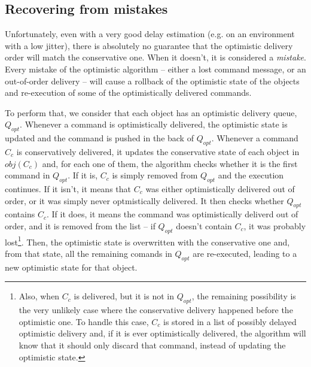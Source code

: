 \documentclass[times, 10pt]{article}
\begin{document}


\subsection{Recovering from mistakes}

Unfortunately, even with a very good delay estimation (e.g. on an environment with a low jitter), there is absolutely no guarantee that the optimistic delivery order will match the conservative one. When it doesn't, it is considered a \emph{mistake}. Every mistake of the optimistic algorithm -- either a lost command message, or an out-of-order delivery -- will cause a rollback of the optimistic state of the objects and re-execution of some of the optimistically delivered commands.

To perform that, we consider that each object has an optimistic delivery queue, $Q_{opt}$. Whenever a command is optimistically delivered, the optimistic state is updated and the command is pushed in the back of $Q_{opt}$. Whenever a command $C_c$ is conservatively delivered, it updates the conservative state of each object in $obj(C_c)$ and, for each one of them, the algorithm checks whether it is the first command in $Q_{opt}$. If it is, $C_c$ is simply removed from $Q_{opt}$ and the execution continues. If it isn't, it means that $C_c$ was either optimistically delivered out of order, or it was simply never optmistically delivered. It then checks whether $Q_{opt}$ contains $C_c$. If it does, it means the command was optimistically deliverd out of order, and it is removed from the list -- if $Q_{opt}$ doesn't contain $C_c$, it was probably lost\footnote{Also, when $C_c$ is delivered, but it is not in $Q_{opt}$, the remaining possibility is the very unlikely case where the conservative delivery happened before the optimistic one. To handle this case, $C_c$ is stored in a list of possibly delayed optimistic delivery and, if it is ever optimistically delivered, the algorithm will know that it should only discard that command, instead of updating the optimistic state.}. Then, the optimistic state is overwritten with the conservative one and, from that state, all the remaining comands in $Q_{opt}$ are re-executed, leading to a new optimistic state for that object.


%
%
\end{document}
